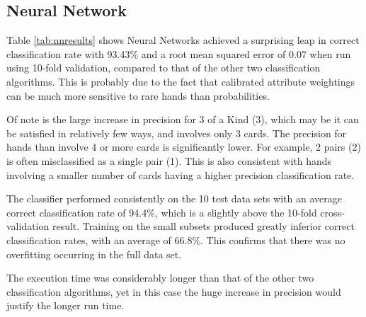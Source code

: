 \documentclass[10pt, a4paper]{article}
\begin{document}
\subsection*{Neural Network}

Table \ref{tab:nnresults} shows Neural Networks achieved a surprising leap in correct classification rate with 93.43\% and a root mean squared error of 0.07 when run using 10-fold validation, compared to that of the other two classification algorithms. This is probably due to the fact that calibrated attribute weightings can be much more sensitive to rare hands than probabilities.

Of note is the large increase in precision for 3 of a Kind (3), which may be it can be satisfied in relatively few ways, and involves only 3 cards. The precision for hands than involve 4 or more cards is significantly lower. For example, 2 pairs (2) is often misclassified as a single pair (1). This is also consistent with hands involving a smaller number of cards having a higher precision classification rate. 

The classifier performed consistently on the 10 test data sets with an average correct classification rate of 94.4\%, which is a slightly above the 10-fold cross-validation result. Training on the small subsets produced greatly inferior correct classification rates, with an average of 66.8\%. This confirms that there was no overfitting occurring in the full data set.

The execution time was considerably longer than that of the other two classification algorithms, yet in this case the huge increase in precision would justify the longer run time.
                 
\end{document}
